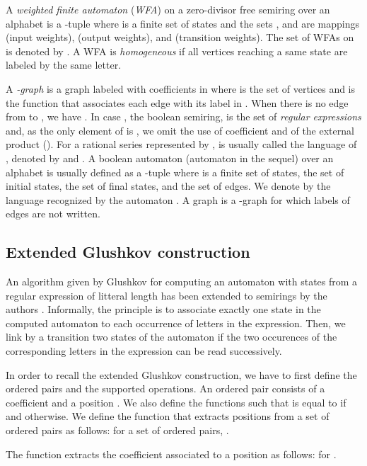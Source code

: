\documentclass[11pt]{article}
\begin{document}
 A {\it weighted finite automaton} ({\it WFA}) on a zero-divisor free semiring
  over an alphabet  \cite{Eil74} is a
-tuple   where  is a finite set of states and the
sets ,
 and  are mappings  (input weights),
 (output weights), and  (transition weights).
The set of WFAs on  is denoted by .
A WFA is {\it homogeneous} if all vertices reaching a same state are labeled by the same letter. 

A {\it -graph} is a graph  labeled with coefficients in  where  is the set of vertices and  is the 
function that associates each edge with its label in . When there is no edge from  to , we have .
In case , the boolean semiring,   is the set of {\it regular
expressions} and, as the only element of  is , we omit
the use of coefficient and of the external product ().
For a rational series  represented by  ,  is usually called the
language of , denoted by  and .
A boolean automaton (automaton in the sequel)  over
an alphabet  is usually defined
\cite{Eil74,HU79} as a -tuple  where  is a
finite set of states,  the set of initial states,  the set of final states, and  the set of edges. We denote by   the language
recognized by the automaton . A graph  is a -graph for which labels of edges are not written.

\subsection{Extended Glushkov construction}

An algorithm given by Glushkov \cite{Glu61} for computing an automaton with  states from a regular expression of litteral length   has been extended to semirings  by the authors \cite{CF03}. Informally, the principle is to associate exactly one state in the computed automaton to each occurrence of letters in the expression. Then, we link by a transition two states of the automaton if the two  occurences of the corresponding letters in the expression can be read successively.

In order to recall  the extended Glushkov construction, we have to first define the ordered pairs and the supported operations.
An ordered pair  consists of a coefficient  and a position .
We also define the functions  such that  is equal to  
if  and  otherwise.
We define  the function that extracts positions from a set of ordered pairs  as follows: for  a set of ordered pairs, . 




The function   extracts the coefficient associated to a position  as follows:  for .
\end{document}

